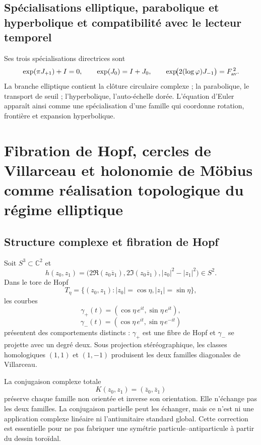 \subsection{Spécialisations elliptique, parabolique et hyperbolique et compatibilité avec le lecteur temporel}

Ses trois spécialisations directrices sont
\begin{equation}\label{p12-83-c11-s1:eq:constantes-euler-tres-ramas}
 \exp(\pi J_{+1})+I=0,\qquad
 \exp(J_0)=I+J_0,\qquad
 \exp\!\bigl(2(\log\varphi)J_{-1}\bigr)=F_{\rm av}^{\,2}.
\end{equation}
La branche elliptique contient la clôture circulaire complexe ; la parabolique, le
transport de seuil ; l’hyperbolique, l’auto-échelle dorée. L’équation
d’Euler apparaît ainsi comme une spécialisation d’une famille qui coordonne rotation,
frontière et expansion hyperbolique.


\section{Fibration de Hopf, cercles de Villarceau et holonomie de Möbius comme réalisation topologique du régime elliptique}

\subsection{Structure complexe et fibration de Hopf}

Soit \(S^3\subset\mathbb C^2\) et
\[
h(z_0,z_1)=
\bigl(2\Re(z_0\overline z_1),
2\Im(z_0\overline z_1),|z_0|^2-|z_1|^2\bigr)
\in S^2.
\]
Dans le tore de Hopf
\[
T_\eta=\{(z_0,z_1):|z_0|=\cos\eta,
|z_1|=\sin\eta\},
\]
les courbes
\[
\gamma_+(t)=(\cos\eta\,e^{it},\sin\eta\,e^{it}),
\]
\[
\gamma_-(t)=(\cos\eta\,e^{it},\sin\eta\,e^{-it})
\]
présentent des comportements distincts : \(\gamma_+\) est une fibre de Hopf et
\(\gamma_-\) se projette avec un degré deux. Sous projection stéréographique, les
classes homologiques \((1,1)\) et \((1,-1)\) produisent les deux familles diagonales
de Villarceau.

La conjugaison complexe totale
\[
K(z_0,z_1)=(\overline z_0,\overline z_1)
\]
préserve chaque famille non orientée et inverse son orientation. Elle n’échange pas
les deux familles. La conjugaison partielle peut les échanger, mais ce n’est ni une
application complexe linéaire ni l’antiunitaire standard global. Cette correction
est essentielle pour ne pas fabriquer une symétrie particule--antiparticule à partir du
dessin toroïdal.

